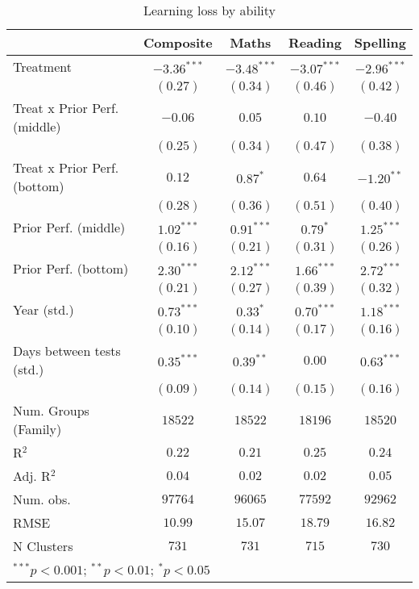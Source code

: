 
\begin{table}
\begin{center}
\begin{tabular}{l c c c c}
\hline
 & Composite & Maths & Reading & Spelling \\
\hline
Treatment                    & $-3.36^{***}$ & $-3.48^{***}$ & $-3.07^{***}$ & $-2.96^{***}$ \\
                             & $(0.27)$      & $(0.34)$      & $(0.46)$      & $(0.42)$      \\
Treat x Prior Perf. (middle) & $-0.06$       & $0.05$        & $0.10$        & $-0.40$       \\
                             & $(0.25)$      & $(0.34)$      & $(0.47)$      & $(0.38)$      \\
Treat x Prior Perf. (bottom) & $0.12$        & $0.87^{*}$    & $0.64$        & $-1.20^{**}$  \\
                             & $(0.28)$      & $(0.36)$      & $(0.51)$      & $(0.40)$      \\
Prior Perf. (middle)         & $1.02^{***}$  & $0.91^{***}$  & $0.79^{*}$    & $1.25^{***}$  \\
                             & $(0.16)$      & $(0.21)$      & $(0.31)$      & $(0.26)$      \\
Prior Perf. (bottom)         & $2.30^{***}$  & $2.12^{***}$  & $1.66^{***}$  & $2.72^{***}$  \\
                             & $(0.21)$      & $(0.27)$      & $(0.39)$      & $(0.32)$      \\
Year (std.)                  & $0.73^{***}$  & $0.33^{*}$    & $0.70^{***}$  & $1.18^{***}$  \\
                             & $(0.10)$      & $(0.14)$      & $(0.17)$      & $(0.16)$      \\
Days between tests (std.)    & $0.35^{***}$  & $0.39^{**}$   & $0.00$        & $0.63^{***}$  \\
                             & $(0.09)$      & $(0.14)$      & $(0.15)$      & $(0.16)$      \\
\hline
Num. Groups (Family)         & $18522$       & $18522$       & $18196$       & $18520$       \\
R$^2$                        & $0.22$        & $0.21$        & $0.25$        & $0.24$        \\
Adj. R$^2$                   & $0.04$        & $0.02$        & $0.02$        & $0.05$        \\
Num. obs.                    & $97764$       & $96065$       & $77592$       & $92962$       \\
RMSE                         & $10.99$       & $15.07$       & $18.79$       & $16.82$       \\
N Clusters                   & $731$         & $731$         & $715$         & $730$         \\
\hline
\multicolumn{5}{l}{\scriptsize{$^{***}p<0.001$; $^{**}p<0.01$; $^{*}p<0.05$}}
\end{tabular}
\caption{Learning loss by ability}
\label{tableability}
\end{center}
\end{table}
